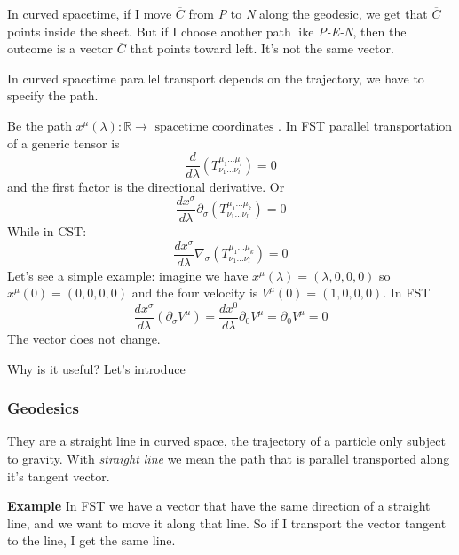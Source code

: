 In curved spacetime, if I move $\overline{C}$ from \emph{P} to \emph{N} along the geodesic, we get that $\overline{C}$ points inside the sheet. But if I choose another path like \emph{P-E-N}, then the outcome is a vector $\overline{C}$ that points toward left. It's not the same vector. \par
In curved spacetime parallel transport depends on the trajectory, we have to specify the path.\par
Be the path $x^{\mu }\left( \lambda  \right) : \mathbb{R} \to \text{ spacetime coordinates }$. In FST parallel transportation of a generic tensor is
\[
\frac{d}{d\lambda } \left( T^{\mu _{1} \ldots \mu _{l}}_{\nu _{1}\ldots \nu _{l}} \right) = 0
\]
and the first factor is the directional derivative. Or
\[
\frac{d x^{\sigma }}{d \lambda } \partial_{\sigma } \left( T^{\mu _{1}\ldots \mu _{k}}_{\nu _{1}\ldots \nu _{l}} \right) = 0
\]
While in CST:
\[
\frac{dx^{\sigma }}{d\lambda } \nabla _{\sigma } \left(T^{\mu _{1}\ldots \mu _{k}}_{\nu _{1}\ldots \nu _{l}} \right) = 0
\]
Let's see a simple example: imagine we have $x^{\mu }\left( \lambda  \right) = \left( \lambda , 0, 0 , 0 \right)$ so $x^{\mu }\left( 0 \right) = \left( 0,0,0,0 \right)$ and the four velocity is $V^{\mu }\left( 0 \right) = \left( 1,0,0,0 \right)$.
In FST 
\[
\frac{dx^{\sigma }}{d\lambda } \left( \partial_{\sigma }V^{\mu } \right) = \frac{dx^{0}}{d\lambda } \partial_{0}V^{\mu } = \partial_{0}V^{\mu } = 0
\]
The vector does not change. \par

Why is it useful? Let's introduce
\subsubsection{Geodesics}
They are a straight line in curved space, the trajectory of a particle only subject to gravity. With \emph{straight line} we mean the path that is parallel transported along it's tangent vector.

\textbf{Example} In FST we have a vector that have the same direction of a straight line, and we want to move it along that line. 
So if I transport the vector tangent to the line, I get the same line.

\label{imm:straigthline}

